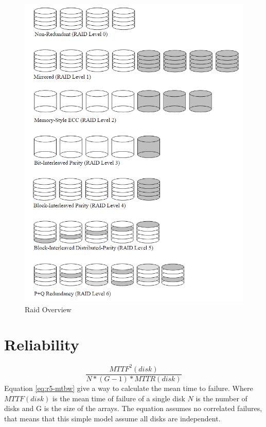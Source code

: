 \documentclass{article}
\begin{document}
\begin{figure}[h]
    \label{fig:raid-overview}
    \caption{Raid Overview \cite{cmu:raidhighperf}}
    \includegraphics[width=\textwidth]{raid-overview}
\end{figure}

\section{Reliability}
\begin{equation}
    \label{eq:r5-mtbw}
    \frac{MTTF^2(disk)}{N*(G-1)*MTTR(disk)}
\end{equation}
Equation \ref{eq:r5-mtbw} give a way to calculate the mean time to failure.
Where \(MTTF(disk)\) is the mean time of failure of a single disk
\(N\) is the number of disks and G is the size of the arrays.
The equation assumes no correlated failures, that means that
this simple model assume all disks are independent.
\end{document}
